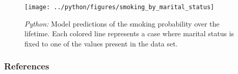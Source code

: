 \documentclass[11pt, aspectratio=169]{beamer}
\begin{document}
\begin{frame}[t]
    \begin{figure}[H]

        \centering
        \texttt{[image: ../python/figures/smoking\_by\_marital\_status]}

        \caption{\emph{Python:} Model predictions of the smoking probability over the
            lifetime. Each colored line represents a case where marital status is fixed to
            one of the values present in the data set.}
        \label{fig:python-predictions}

    \end{figure}
\end{frame}






 {
    \begin{frame}
        \frametitle{}
    \end{frame}

}

\begin{frame}[allowframebreaks]
    \frametitle{References}
    \renewcommand{\bibfont}{\normalfont\footnotesize}
    \printbibliography
\end{frame}
\end{document}
